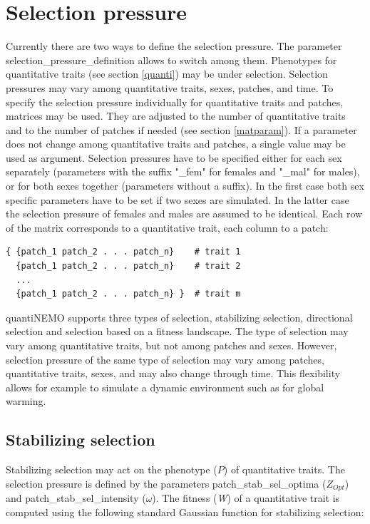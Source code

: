 \documentclass[letterpaper,12pt,oneside]{book}
\begin{document}
\section{Selection pressure}\label{selPressure}
Currently there are two ways to define the selection pressure. The parameter \textsf{selection\_pressure\_definition} allows to switch among them. Phenotypes for quantitative traits (see section \ref{quanti}) may be under selection. Selection pressures may vary among quantitative traits, sexes, patches, and time. To specify the selection pressure individually for quantitative traits and patches, matrices may be used. They are adjusted to the number of quantitative traits and to the number of patches if needed (see section \ref{matparam}). If a parameter does not change among quantitative traits and patches, a single value may be used as argument. Selection pressures have to be specified either for each sex separately (parameters with the suffix "\_fem" for females and "\_mal" for males), or for both sexes together (parameters without a suffix). In the first case both sex specific parameters have to be set if two sexes are simulated. In the latter case the selection pressure of females and males are assumed to be identical. Each row of the matrix corresponds to a quantitative trait, each column to a patch:
\begin{lstlisting}[frame=single]
{ {patch_1 patch_2 . . . patch_n}    # trait 1
  {patch_1 patch_2 . . . patch_n}    # trait 2
  ...
  {patch_1 patch_2 . . . patch_n} }  # trait m
\end{lstlisting}

quantiNEMO supports three types of selection, stabilizing selection, directional selection and selection based on a fitness landscape. The type of selection may vary among quantitative traits, but not among patches and sexes. However, selection pressure of the same type of selection may vary among patches, quantitative traits, sexes, and may also change through time. This flexibility allows for example to simulate a dynamic environment such as for global warming.   

\subsection{Stabilizing selection}
Stabilizing selection may act on the phenotype ($P$) of quantitative traits. The selection pressure is defined by the parameters \textsf{patch\_stab\_sel\_optima} ($Z_{Opt}$) and \textsf{patch\_stab\_sel\_intensity} ($\omega$). The fitness (\textit{W}) of a quantitative trait is computed using the following standard Gaussian function for stabilizing selection: 
\end{document}
